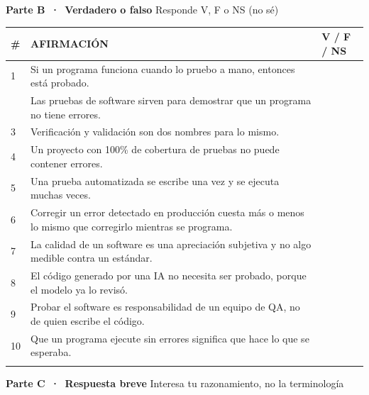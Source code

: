 \documentclass[11pt,a4paper]{article}
\newcommand{\bandaSeccion}[3]{%
  \needspace{7\baselineskip}%
  \vspace{10pt}%
  \noindent\begin{tcolorbox}[
    enhanced, colback=aiepNavy, colframe=aiepNavy,
    boxrule=0pt, arc=2pt, left=10pt, right=10pt, top=5pt, bottom=5pt,
    boxsep=0pt]
    {\color{white}\bfseries\large Parte #1\, ·\, #2}%
    \hfill{\color{white!75}\footnotesize #3}
  \end{tcolorbox}%
  \vspace{2pt}%
}
\begin{document}
\bandaSeccion{B}{Verdadero o falso}{Responde V, F o NS (no sé)}

\vspace{2pt}
\renewcommand{\arraystretch}{1.45}
\noindent\begin{tabularx}{\linewidth}{@{}p{0.9em} X >{\centering\arraybackslash}p{2.3cm}@{}}
\toprule
{\color{slate}\footnotesize\#} & {\color{aiepNavy}\bfseries\footnotesize AFIRMACIÓN} & {\color{aiepNavy}\bfseries\footnotesize V / F / NS} \\
\midrule
1 & Si un programa funciona cuando lo pruebo a mano, entonces está probado. & \\
\arrayrulecolor{borderCol}\hline
2 & Las pruebas de software sirven para demostrar que un programa no tiene errores. & \\
\hline
3 & Verificación y validación son dos nombres para lo mismo. & \\
\hline
4 & Un proyecto con 100\% de cobertura de pruebas no puede contener errores. & \\
\hline
5 & Una prueba automatizada se escribe una vez y se ejecuta muchas veces. & \\
\hline
6 & Corregir un error detectado en producción cuesta más o menos lo mismo que corregirlo mientras se programa. & \\
\hline
7 & La calidad de un software es una apreciación subjetiva y no algo medible contra un estándar. & \\
\hline
8 & El código generado por una IA no necesita ser probado, porque el modelo ya lo revisó. & \\
\hline
9 & Probar el software es responsabilidad de un equipo de QA, no de quien escribe el código. & \\
\hline
10 & Que un programa ejecute sin errores significa que hace lo que se esperaba. & \\
\arrayrulecolor{black}\bottomrule
\end{tabularx}
\renewcommand{\arraystretch}{1}

\bandaSeccion{C}{Respuesta breve}{Interesa tu razonamiento, no la terminología}
\end{document}
